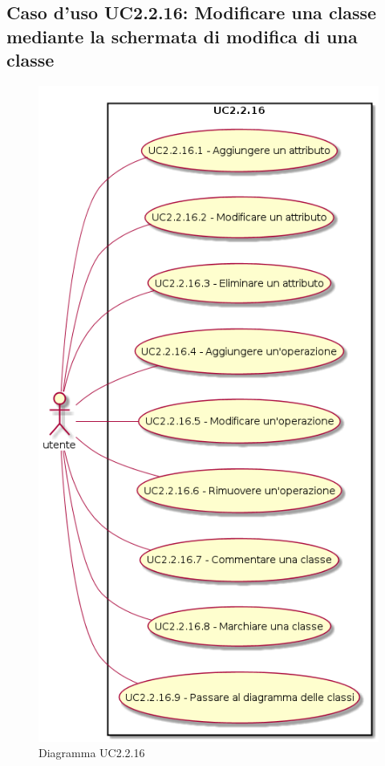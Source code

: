 \documentclass[../AnalisiDeiRequisiti.tex]{subfiles}
\begin{document}
			\subsection{Caso d'uso UC2.2.16: Modificare una classe mediante la schermata di modifica di una classe}
			\begin{figure} [H]
				\centering
				\includegraphics[scale=0.45]{./Figures/UC2.2.16.png}
				\caption{Diagramma UC2.2.16}\label{}
			\end{figure}
\end{document}
